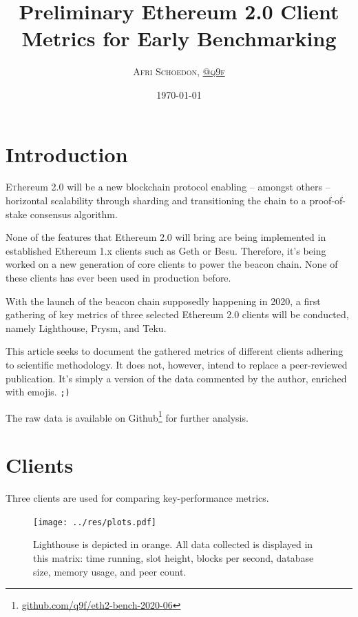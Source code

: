 \documentclass[twoside,twocolumn]{article}
\title{Preliminary Ethereum 2.0 Client Metrics for Early Benchmarking}
\author{\textsc{Afri Schoedon, \href{https://github.com/q9f}{@q9f}}}\date{\today}
\begin{document}
\maketitle
\section{Introduction}
\lettrine[nindent=0em,lines=3]{E}thereum 2.0 will be a new blockchain protocol enabling -- amongst others -- horizontal scalability through sharding and transitioning the chain to a proof-of-stake consensus algorithm.\par

None of the features that Ethereum 2.0 will bring are being implemented in established Ethereum 1.x clients such as Geth or Besu. Therefore, it's being worked on a new generation of core clients to power the beacon chain. None of these clients has ever been used in production before.\par

With the launch of the beacon chain supposedly happening in 2020, a first gathering of key metrics of three selected Ethereum 2.0 clients will be conducted, namely Lighthouse, Prysm, and Teku.\par

This article seeks to document the gathered metrics of different clients adhering to scientific methodology. It does not, however, intend to replace a peer-reviewed publication. It's simply a version of the data commented by the author, enriched with emojis. \texttt{;)}\par

The raw data is available on Github\footnote{\href{https://github.com/q9f/eth2-bench-2020-06}{github.com/q9f/eth2-bench-2020-06}} for further analysis.

\section{Clients}
\label{sec:cli}

Three clients are used for comparing key-performance metrics.\par

\begin{figure}[t]
	\centering
	\texttt{[image: ../res/plots.pdf]}
	\caption{Lighthouse is depicted in orange. All data collected is displayed in this matrix: time running, slot height, blocks per second, database size, memory usage, and peer count.}
	\label{img:lh}
\end{figure}
\end{document}
